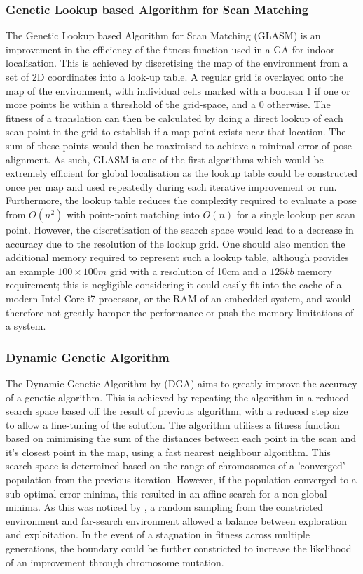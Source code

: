 \documentclass[authoryearcitations]{UoYCSproject}
\begin{document}
\subsubsection{Genetic Lookup based Algorithm for Scan Matching}
The Genetic Lookup based Algorithm for Scan Matching (GLASM) \cite{Lenac2007-xm} is an improvement in the efficiency of the fitness function used in a GA for indoor localisation. This is achieved by discretising the map of the environment from a set of 2D coordinates into a look-up table. A regular grid is overlayed onto the map of the environment, with individual cells marked with a boolean 1 if one or more points lie within a threshold of the grid-space, and a 0 otherwise. The fitness of a translation can then be calculated by doing a direct lookup of each scan point in the grid to establish if a map point exists near that location. The sum of these points would then be maximised to achieve a minimal error of pose alignment. As such, GLASM is one of the first algorithms which would be extremely efficient for global localisation as the lookup table could be constructed once per map and used repeatedly during each iterative improvement or run. Furthermore, the lookup table reduces the complexity required to evaluate a pose from $O(n^2)$ with point-point matching into $O(n)$ for a single lookup per scan point. However, the discretisation of the search space would lead to a decrease in accuracy due to the resolution of the lookup grid. One should also mention the additional memory required to represent such a lookup table, although \citeauthor{Lenac2007-xm} provides an example $100\times100m$ grid with a resolution of 10cm and a $125kb$ memory requirement; this is negligible considering it could easily fit into the cache of a modern Intel Core i7 processor, or the RAM of an embedded system, and would therefore not greatly hamper the performance or push the memory limitations of a system. 


\subsubsection{Dynamic Genetic Algorithm}
The Dynamic Genetic Algorithm by \citet{Chow2004-xc} (DGA) aims to greatly improve the accuracy of a genetic algorithm. This is achieved by repeating the algorithm in a reduced search space based off the result of previous algorithm, with a reduced step size to allow a fine-tuning of the solution. The algorithm utilises a fitness function based on minimising the sum of the distances between each point in the scan and it's closest point in the map, using a fast nearest neighbour algorithm. This search space is determined based on the range of chromosomes of a 'converged' population from the previous iteration. However, if the population converged to a sub-optimal error minima, this resulted in an affine search for a non-global minima. As this was noticed by \citeauthor{Chow2004-xc}, a random sampling from the constricted environment and far-search environment allowed a balance between exploration and exploitation. In the event of a stagnation in fitness across multiple generations, the boundary could be further constricted to increase the likelihood of an improvement through chromosome mutation. 
\end{document}
